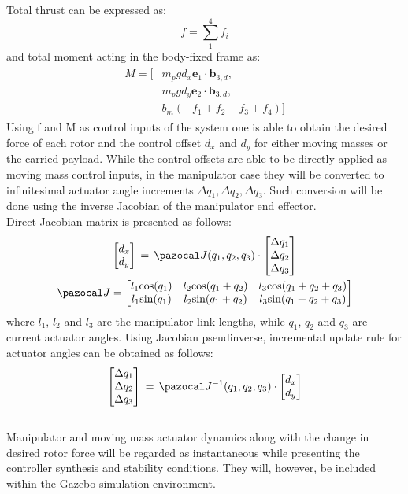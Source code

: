 Total thrust can be expressed as:
\begin{equation}
	f = \sum_{1}^{4}f_i
\end{equation}
and total moment acting in the body-fixed frame as:
\begin{align}
	\begin{split}
	M = [&m_{p}gd_x  \textbf{e}_1 \cdot \textbf{b}_{3,d} , \\
	&m_{p}gd_y \textbf{e}_2 \cdot \textbf{b}_{3,d}, \\
	&b_m(-f_1 + f_2 - f_3 + f_4)]
	\end{split}
\end{align}
Using f and M as control inputs of the system one is able to obtain the desired force of each rotor and the control offset $d_x$ and $d_y$ for either moving masses or the carried payload. While the control offsets are able to be directly applied as moving mass control inputs, in the manipulator case they will be converted to infinitesimal actuator angle increments $\Delta q_1, \Delta q_2, \Delta q_3$. Such conversion will be done using the inverse Jacobian of the manipulator end effector.\\
Direct Jacobian matrix is presented as follows:
\begin{gather}
	\begin{bmatrix}
		d_x \\
		d_y
	\end{bmatrix}
	\, = \, 
	\Ja (q_1, q_2, q_3)
	\cdot 
	\begin{bmatrix}
		\Delta q_1 \\
		\Delta q_2 \\
		\Delta q_3
	\end{bmatrix} \\
	\Ja = 
	\begin{bmatrix}
		l_1\text{cos}(q_1) & l_2 \text{cos}(q_1 + q_2) & l_3 \text{cos}(q_1 + q_2 + q_3) \\
		l_1\text{sin}(q_1) & l_2 \text{sin}(q_1 + q_2) & l_3 \text{sin}(q_1 + q_2 + q_3) 
	\end{bmatrix}
\end{gather}
where $l_1$, $l_2$ and $l_3$ are the manipulator link lengths, while $q_1$, $q_2$ and $q_3$ are current actuator angles. Using Jacobian pseudinverse, incremental update rule for actuator angles can be obtained as follows:
\begin{equation}
	\begin{bmatrix}
	\Delta q_1 \\
	\Delta q_2 \\
	\Delta q_3
	\end{bmatrix} 
	\, = \, \Ja^{-1} (q_1, q_2, q_3) \cdot
	\begin{bmatrix}
	d_x \\
	d_y
	\end{bmatrix}
\end{equation}
 \\
Manipulator and moving mass actuator dynamics along with the change in desired rotor force will be regarded as instantaneous while presenting the controller synthesis and stability conditions. They will, however, be included within the Gazebo simulation environment.